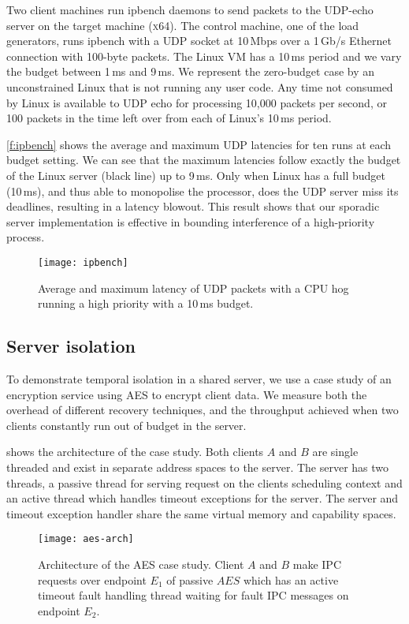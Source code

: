 Two client machines run ipbench daemons to send packets to the UDP-echo server on the target machine
(\textsc{x64}). The control machine, one of the load generators, runs ipbench with a \gls{UDP} socket at 10\,Mbps over a 1\,Gb/s Ethernet connection with 100-byte packets. The Linux VM has a 10\,ms period and we vary the
budget between 1\,ms and 9\,ms.
We represent the zero-budget case by an unconstrained Linux that is not running any user code.
Any time not consumed by Linux is available to UDP echo for processing
10,000 packets per second, or 100 packets in the time left over from
each of Linux's 10\,ms period.

\autoref{f:ipbench} shows the average and maximum \gls{UDP} latencies for
ten runs at each budget setting. We can see that the maximum latencies
follow exactly the budget of the Linux server (black line) up to 9\,ms. Only
when Linux has a full budget (10\,ms), and thus able to monopolise the
processor, does the UDP server miss its deadlines, resulting in a
latency blowout.  This result shows that our sporadic server implementation is effective in bounding interference of a high-priority process.

\begin{figure}[h]
  \centering
  \texttt{[image: ipbench]}
  \caption{Average and maximum latency of UDP packets with a CPU hog running a high priority with a 10\,ms budget.}
  \label{f:ipbench}
\end{figure}

\subsection{Server isolation} 

To demonstrate temporal isolation in a shared server, we use a case study of an encryption service
using \gls{AES} to encrypt client data. We measure both the overhead of different recovery techniques, and the
throughput achieved when two clients constantly run out of budget in the server.

 shows the architecture of the case study. Both clients $A$ and $B$ are single
 threaded and exist in separate address spaces to the server. The server has two threads, a passive
 thread for serving request on the clients scheduling context and an active thread which handles
 timeout exceptions for the server. The server and timeout exception handler share the same virtual
 memory and capability spaces.

\begin{figure}
\centering
\texttt{[image: aes-arch]}
\caption{Architecture of the \gls{AES} case study. Client $A$ and $B$ make \gls{IPC} requests over
endpoint $E_{1}$ of passive $AES$ which has an active timeout fault handling thread waiting for
fault \gls{IPC} messages on endpoint $E_{2}$.}
\label{f:aes-arch}
\end{figure}

